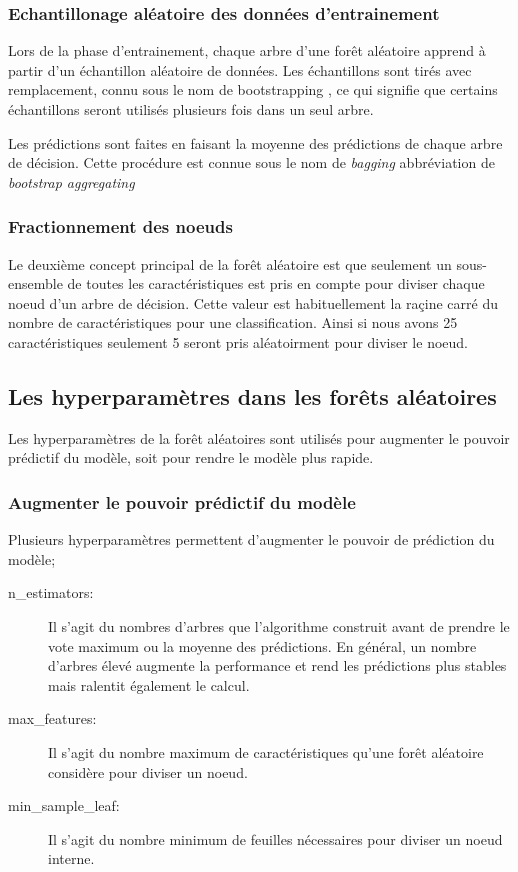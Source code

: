    \subsubsection{Echantillonage aléatoire des données d'entrainement}

    Lors de la phase d'entrainement, chaque arbre d'une forêt aléatoire apprend
    à partir d'un échantillon aléatoire de données. Les échantillons sont tirés 
    avec remplacement, connu sous le nom de \og bootstrapping \fg, ce qui 
    signifie que certains échantillons seront utilisés plusieurs fois dans un 
    seul arbre.

    Les prédictions sont faites en faisant la moyenne des prédictions de chaque
    arbre de décision. Cette procédure est connue sous le nom de \textit{bagging}
    abbréviation de \textit{bootstrap aggregating}

   \subsubsection{Fractionnement des noeuds}

    Le deuxième concept principal de la forêt aléatoire est que seulement un
    sous-ensemble de toutes les caractéristiques est pris en compte pour 
    diviser chaque noeud d'un arbre de décision. Cette valeur est 
    habituellement la raçine carré du nombre de caractéristiques pour une
    classification. Ainsi si nous avons 25 caractéristiques seulement 5
    seront pris aléatoirment pour diviser le noeud.

  \subsection{Les hyperparamètres dans les forêts aléatoires}

  Les hyperparamètres de la forêt aléatoires sont utilisés pour augmenter le
  pouvoir prédictif du modèle, soit pour rendre le modèle plus rapide.

  \subsubsection{Augmenter le pouvoir prédictif du modèle}

  Plusieurs hyperparamètres permettent d'augmenter le pouvoir de prédiction du
  modèle;
  \begin{description}
    \item[n\_estimators: ]Il s'agit du nombres d'arbres que l'algorithme
      construit avant de prendre le vote maximum ou la moyenne des prédictions.
      En général, un nombre d'arbres élevé augmente la performance et rend les
      prédictions plus stables mais ralentit également le calcul.
    \item[max\_features: ]Il s'agit du nombre maximum de caractéristiques qu'une
      forêt aléatoire considère pour diviser un noeud.
    \item[min\_sample\_leaf: ] Il s'agit du nombre minimum de feuilles nécessaires
      pour diviser un noeud interne.
  \end{description}

